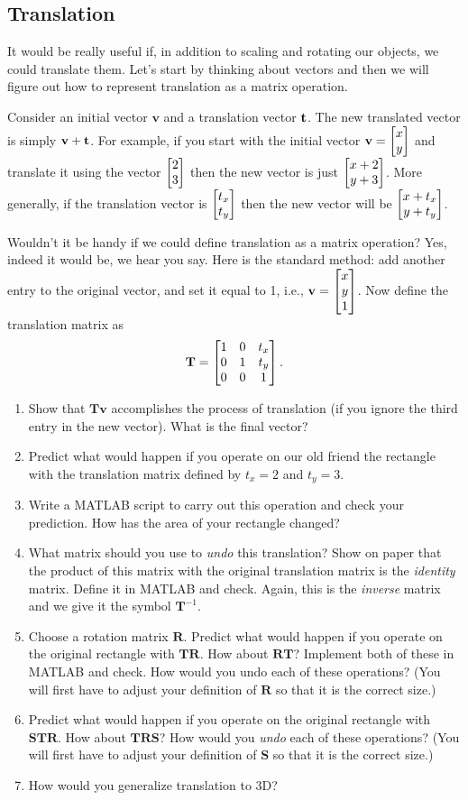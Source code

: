 


\subsection{Translation}

It would be really useful if, in addition to scaling and rotating our objects, we could translate them. Let's start by thinking about vectors and then we will figure out how to represent translation as a matrix operation.

Consider an initial vector $\mathbf{v}$ and a translation vector $\mathbf{t}$. The new translated vector is simply $\mathbf{v} + \mathbf{t}$. For example, if you start with the initial vector $\mathbf{v} = \begin{bmatrix} x \\ y \end{bmatrix}$ and translate it using the vector $\begin{bmatrix} 2 \\ 3 \end{bmatrix}$ then the new vector is just $\begin{bmatrix} x+2 \\ y+3 \end{bmatrix}$. More generally, if the translation vector is $\begin{bmatrix} t_x \\ t_y \end{bmatrix}$ then the new vector will be $\begin{bmatrix} x+t_x \\ y+t_y \end{bmatrix}$.

Wouldn't it be handy if we could define translation as a matrix operation? Yes, indeed it would be, we hear you say. Here is the standard method: add another entry to the original vector, and set it equal to 1, i.e., $\mathbf{v} = \begin{bmatrix} x \\ y \\ 1 \end{bmatrix}$. Now define the translation matrix as
\[ \mathbf{T} = \begin{bmatrix} 1 & 0 & t_x \\ 0 & 1 & t_y \\ 0 & 0 & 1 \end{bmatrix}. \]

\begin{prob}
\begin{enumerate}
\item Show that $\mathbf{T} \mathbf{v}$ accomplishes the process of translation (if you ignore the third entry in the new vector). What is the final vector?
\item Predict what would happen if you operate on our old friend the rectangle with the translation matrix defined by $t_x=2$ and $t_y=3$.
\item Write a MATLAB script to carry out this operation and check your prediction. How has the area of your rectangle changed?
\item What matrix should you use to \textit{undo} this translation? Show on paper that the product of this matrix with the original translation matrix is the \textit{identity} matrix. Define it in MATLAB and check. Again, this is the \textit{inverse} matrix and we give it the symbol $\mathbf{T}^{-1}$.
\item Choose a rotation matrix $\mathbf{R}$. Predict what would happen if you operate on the original rectangle with $\mathbf{T} \mathbf{R}$. How about $\mathbf{R} \mathbf{T}$? Implement both of these in MATLAB and check. How would you undo each of these operations? (You will first have to adjust your definition of $\mathbf{R}$ so that it is the correct size.)
\item Predict what would happen if you operate on the original rectangle with $\mathbf{S} \mathbf{T} \mathbf{R}$. How about $\mathbf{T} \mathbf{R} \mathbf{S}$? How would you \textit{undo} each of these operations? (You will first have to adjust your definition of $\mathbf{S}$ so that it is the correct size.)
\item How would you generalize translation to 3D?
\end{enumerate}
\end{prob}

